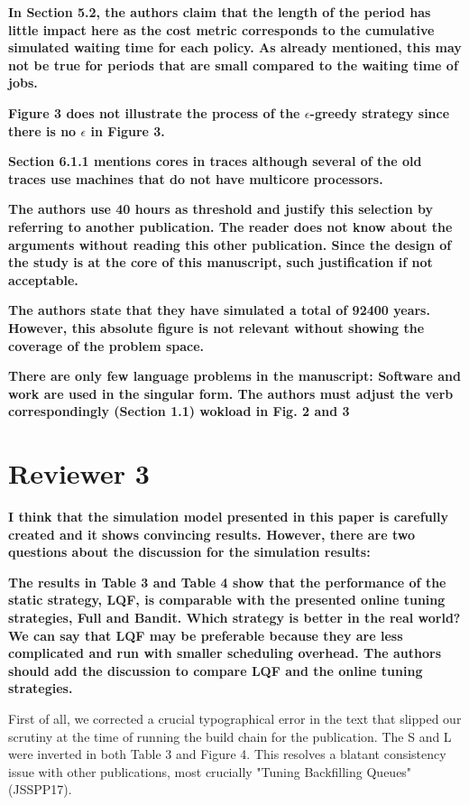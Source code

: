 \documentclass[]{article}
\begin{document}
\textbf{In Section 5.2, the authors claim that the length of the period has little impact here as the cost metric corresponds
to the cumulative simulated waiting time for each policy. As already mentioned, this may not be true for periods that
are small compared to the waiting time of jobs.
}

\textbf{Figure 3 does not illustrate the process of the $\epsilon$-greedy strategy since there is no $\epsilon$ in Figure 3.
}

\textbf{Section 6.1.1 mentions cores in traces although several of the old traces use machines that do not have multicore
processors.
}

\textbf{The authors use 40 hours as threshold and justify this selection by referring to another publication. The reader does
not know about the arguments without reading this other publication. Since the design of the study is at the core of
this manuscript, such justification if not acceptable.
}

\textbf{The authors state that they have simulated a total of 92400 years. However, this absolute figure is not relevant
without showing the coverage of the problem space.
}

\textbf{There are only few language problems in the manuscript:
Software and work are used in the singular form. The authors must adjust the verb correspondingly (Section 1.1)
wokload in Fig. 2 and 3
}



\section{Reviewer 3}


\textbf{I think that the simulation model presented in this paper is carefully created and it shows convincing results.
However, there are two questions about the discussion for the simulation results:
}

\textbf{The results in Table 3 and Table 4 show that the performance of the static strategy, LQF, is comparable with the
presented online tuning strategies, Full and Bandit. Which strategy is better in the real world? We can say that LQF
may be preferable because they are less complicated and run with smaller scheduling overhead. The authors should add
the discussion to compare LQF and the online tuning strategies.
}

First of all, we corrected a crucial typographical error in the text that slipped
our scrutiny at the time of running the build chain for the publication. The S and
L were inverted in both Table 3 and Figure 4. This resolves a blatant
consistency issue with other publications, most crucially "Tuning Backfilling
Queues"(JSSPP17).
\end{document}

